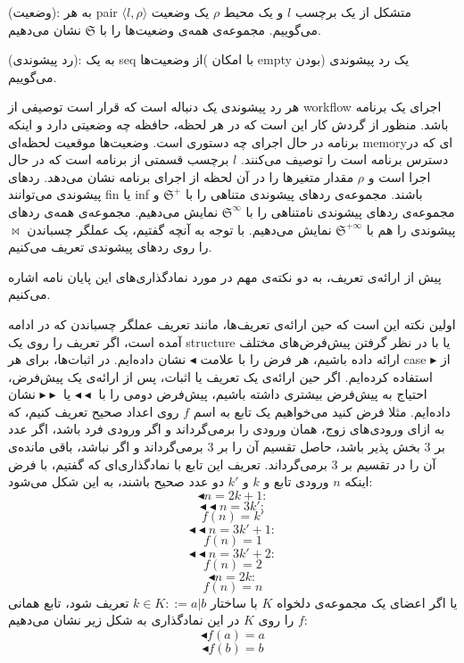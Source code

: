 \begin{defn}
	(وضعیت): به هر \gls*{pair} متشکل از یک برچسب $l$ و یک محیط $\rho$ یک وضعیت  
	$\langle l , \rho \rangle$
	می‌گوییم. مجموعه‌ی همه‌ی وضعیت‌ها را با $\mathfrak{S}$ نشان می‌دهیم.
\end{defn}
\begin{defn}
	(رد پیشوندی): به یک \gls*{seq} از وضعیت‌ها( با امکان \gls*{empty} بودن) یک رد پیشوندی می‌گوییم.
\end{defn}

هر رد پیشوندی یک دنباله است که قرار است توصیفی از \gls{workflow} اجرای یک برنامه باشد. منظور از گردش کار این است که در هر لحظه، حافظه چه وضعیتی دارد و اینکه برنامه در حال اجرای چه دستوری است. وضعیت‌ها موقعیت لحظه‌ای \gls*{memory}ا‌ی که در دسترس برنامه است را توصیف می‌کنند. $l$ برچسب قسمتی از برنامه‌ است که در حال اجرا است و $\rho$ مقدار متغیر‌ها را در آن لحظه از اجرای برنامه نشان می‌دهد. ردهای پیشوندی می‌توانند \gls*{fin} یا \gls*{inf} باشند. مجموعه‌ی ردهای پیشوندی‌ متناهی را با $\mathfrak{S^+}$ و مجموعه‌ی ردهای پیشوندی نامتناهی را با  $\mathfrak{S^\infty}$ نمایش می‌دهیم. مجموعه‌ی همه‌ی ردهای پیشوندی را هم با $\mathfrak{S^{+\infty}}$ نمایش می‌دهیم. 
با توجه به آنچه گفتیم، یک عملگر چسباندن $\Join$ را روی ردهای پیشوندی تعریف می‌کنیم. 

پیش از ارائه‌ی تعریف، به دو نکته‌ی مهم در مورد نمادگذاری‌های این پایان نامه اشاره می‌کنیم.

اولین نکته این است که حین ارائه‌ی تعریف‌ها، مانند تعریف عملگر چسباندن که در ادامه آمده است، اگر تعریف را روی یک \gls*{structure} یا با در نظر گرفتن پیش‌فرض‌های مختلف ارائه داده باشیم، هر فرض را با علامت 
$\blacktriangleleft$
نشان داده‌ایم. در اثبات‌ها، برای هر \gls*{case} از 
$\blacktriangleright$
استفاده کرده‌ایم. اگر حین ارائه‌ی یک تعریف یا اثبات، پس از ارائه‌ی یک پیش‌فرض، احتیاج به پیش‌فرض بیشتری داشته باشیم، پیش‌فرض دومی را با $\blacktriangleleft\blacktriangleleft$ یا $\blacktriangleright\blacktriangleright$ نشان داده‌ایم. مثلا فرض کنید می‌خواهیم یک تابع به اسم $f$ روی اعداد صحیح تعریف کنیم، که به ازای ورودی‌های زوج، همان ورودی را برمی‌گرداند و اگر ورودی فرد باشد، اگر  عدد بر 3 بخش پذیر باشد، حاصل تقسیم آن را بر 3 برمی‌گرداند و اگر نباشد، باقی مانده‌ی آن را در تقسیم بر 3 برمی‌گرداند. تعریف این تابع با نمادگذاری‌ای که گفتیم، با فرض اینکه $n$ ورودی تابع و $k$ و $k'$ دو عدد صحیح باشند، به این شکل می‌شود:
$$\blacktriangleleft n=2k+1:$$
$$\blacktriangleleft\blacktriangleleft n=3k':$$
$$f(n)=k'$$
$$\blacktriangleleft\blacktriangleleft n=3k'+1:$$
$$f(n)=1$$
$$\blacktriangleleft\blacktriangleleft n=3k'+2:$$
$$f(n)=2$$
$$\blacktriangleleft n=2k:$$
$$f(n)=n$$
 یا اگر اعضای یک مجموعه‌ی دلخواه $K$ با ساختار 
 $k \in K ::= a | b$
 تعریف شود، تابع همانی $f$ را روی $K$ در این نمادگذاری به شکل زیر نشان می‌دهیم: 
$$\blacktriangleleft f(a)=a$$ 
$$\blacktriangleleft f(b)=b$$
 

